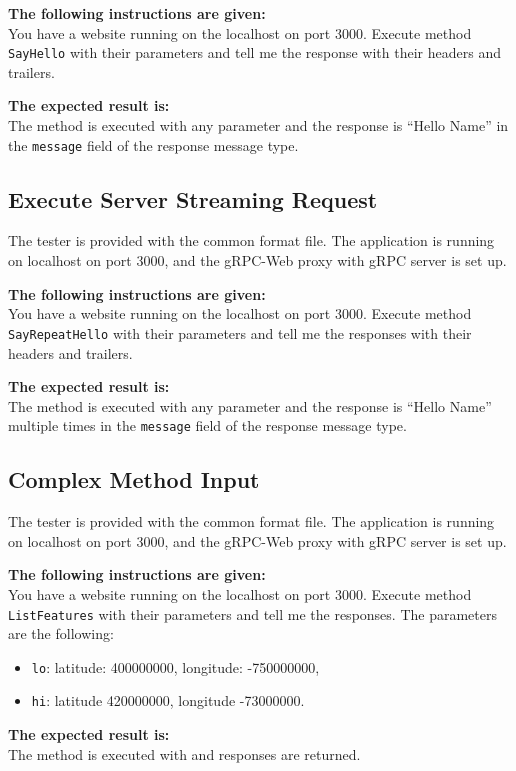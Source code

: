 \textbf{The following instructions are given:}\\
You have a website running on the localhost on port 3000.
Execute method \texttt{SayHello} with their parameters and tell me the response with their headers and trailers.

\textbf{The expected result is:}\\
The method is executed with any parameter
and the response is \enquote{Hello Name} in the \texttt{message} field of the response message type.

\subsection{Execute Server Streaming Request}
The tester is provided with the common format file.
The application is running on localhost on port 3000, and the gRPC-Web proxy with gRPC server is set up.

\textbf{The following instructions are given:}\\
You have a website running on the localhost on port 3000.
Execute method \texttt{SayRepeatHello} with their parameters and tell me the responses with their headers and trailers.

\textbf{The expected result is:}\\
The method is executed with any parameter
and the response is \enquote{Hello Name} multiple times in the \texttt{message} field of the response message type.

\subsection{Complex Method Input}
The tester is provided with the common format file.
The application is running on localhost on port 3000, and the gRPC-Web proxy with gRPC server is set up.

\textbf{The following instructions are given:}\\
You have a website running on the localhost on port 3000.
Execute method \texttt{ListFeatures} with their parameters and tell me the responses.
The parameters are the following:
\begin{itemize}
    \item \texttt{lo}: latitude: 400000000, longitude: -750000000,
    \item \texttt{hi}: latitude 420000000, longitude -73000000.
\end{itemize}

\textbf{The expected result is:}\\
The method is executed with and responses are returned.

